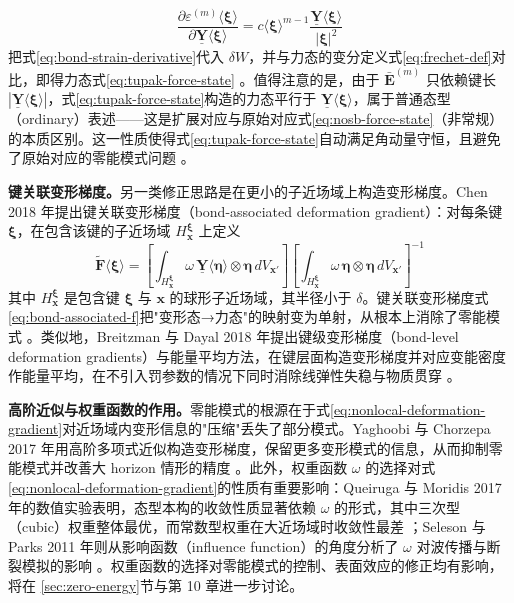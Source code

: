 \begin{equation}
  \frac{\partial\varepsilon^{(m)}\langle\boldsymbol{\xi}\rangle}{\partial\underline{\mathbf{Y}}\langle\boldsymbol{\xi}\rangle}
  =c\langle\boldsymbol{\xi}\rangle^{m-1}\frac{\underline{\mathbf{Y}}\langle\boldsymbol{\xi}\rangle}{|\boldsymbol{\xi}|^{2}}
  \label{eq:bond-strain-derivative}
\end{equation}
把式\eqref{eq:bond-strain-derivative}代入 $\delta W$，并与力态的变分定义式\eqref{eq:frechet-def}对比，即得力态式\eqref{eq:tupak-force-state} \cite{TupekRadovitzky2014}。值得注意的是，由于 $\bar{\mathbf{E}}^{(m)}$ 只依赖键长 $|\underline{\mathbf{Y}}\langle\boldsymbol{\xi}\rangle|$，式\eqref{eq:tupak-force-state}构造的力态平行于 $\underline{\mathbf{Y}}\langle\boldsymbol{\xi}\rangle$，属于普通态型（ordinary）表述——这是扩展对应与原始对应式\eqref{eq:nosb-force-state}（非常规）的本质区别。这一性质使得式\eqref{eq:tupak-force-state}自动满足角动量守恒，且避免了原始对应的零能模式问题 \cite{TupekRadovitzky2014}。

\textbf{键关联变形梯度。}另一类修正思路是在更小的子近场域上构造变形梯度。Chen 2018 年提出键关联变形梯度（bond-associated deformation gradient）：对每条键 $\boldsymbol{\xi}$，在包含该键的子近场域 $H_{\mathbf{x}}^{\boldsymbol{\xi}}$ 上定义
\begin{equation}
  \tilde{\mathbf{F}}\langle\boldsymbol{\xi}\rangle
  =\left[\int_{H_{\mathbf{x}}^{\boldsymbol{\xi}}}\omega\,\underline{\mathbf{Y}}\langle\boldsymbol{\eta}\rangle\otimes\boldsymbol{\eta}\,dV_{\mathbf{x}'}\right]
  \left[\int_{H_{\mathbf{x}}^{\boldsymbol{\xi}}}\omega\,\boldsymbol{\eta}\otimes\boldsymbol{\eta}\,dV_{\mathbf{x}'}\right]^{-1}
  \label{eq:bond-associated-f}
\end{equation}
其中 $H_{\mathbf{x}}^{\boldsymbol{\xi}}$ 是包含键 $\boldsymbol{\xi}$ 与 $\mathbf{x}$ 的球形子近场域，其半径小于 $\delta$。键关联变形梯度式\eqref{eq:bond-associated-f}把"变形态→力态"的映射变为单射，从根本上消除了零能模式 \cite{Chen2018}。类似地，Breitzman 与 Dayal 2018 年提出键级变形梯度（bond-level deformation gradients）与能量平均方法，在键层面构造变形梯度并对应变能密度作能量平均，在不引入罚参数的情况下同时消除线弹性失稳与物质贯穿 \cite{BreitzmanDayal2018}。

\textbf{高阶近似与权重函数的作用。}零能模式的根源在于式\eqref{eq:nonlocal-deformation-gradient}对近场域内变形信息的"压缩"丢失了部分模式。Yaghoobi 与 Chorzepa 2017 年用高阶多项式近似构造变形梯度，保留更多变形模式的信息，从而抑制零能模式并改善大 horizon 情形的精度 \cite{YaghoobiChorzepa2017}。此外，权重函数 $\omega$ 的选择对式\eqref{eq:nonlocal-deformation-gradient}的性质有重要影响：Queiruga 与 Moridis 2017 年的数值实验表明，态型本构的收敛性质显著依赖 $\omega$ 的形式，其中三次型（cubic）权重整体最优，而常数型权重在大近场域时收敛性最差 \cite{QueirugaMoridis2017}；Seleson 与 Parks 2011 年则从影响函数（influence function）的角度分析了 $\omega$ 对波传播与断裂模拟的影响 \cite{SelesonParks2011}。权重函数的选择对零能模式的控制、表面效应的修正均有影响，将在 \ref{sec:zero-energy}节与第 10 章进一步讨论。

